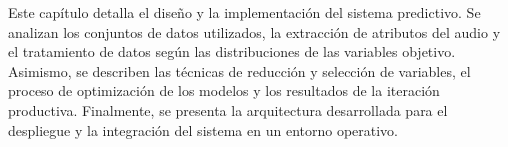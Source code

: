 

Este capítulo detalla el diseño y la implementación del sistema predictivo. Se analizan los conjuntos de datos utilizados, la extracción de atributos del audio y el tratamiento de datos según las distribuciones de las variables objetivo. Asimismo, se describen las técnicas de reducción y selección de variables, el proceso de optimización de los modelos y los resultados de la iteración productiva. Finalmente, se presenta la arquitectura desarrollada para el despliegue y la integración del sistema en un entorno operativo.

